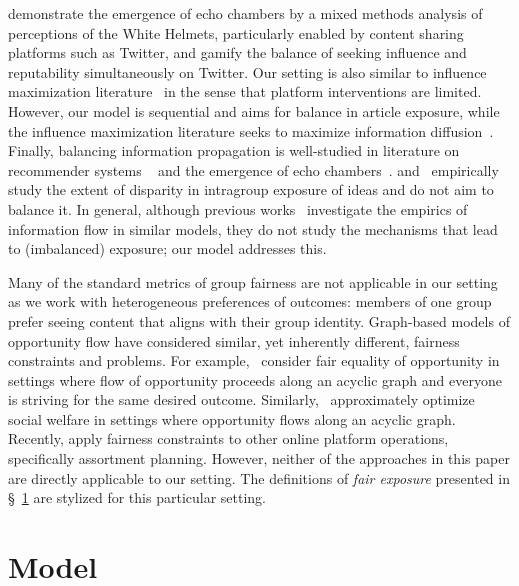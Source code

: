 \documentclass[letterpaper]{article} %
\begin{document}
\citet{starbird2018ecosystem} demonstrate the emergence of echo chambers by a mixed methods analysis of perceptions of the White Helmets, particularly enabled by content sharing platforms such as Twitter, and \citet{jeon2021chamberbreaker} gamify the balance of seeking influence and reputability simultaneously on Twitter.
%
Our setting is also similar to influence maximization literature~\citep{kempe2003maximizing} in the sense that platform interventions are limited.
%
However, our model is sequential and aims for balance in article exposure, while the influence maximization literature  seeks to maximize information diffusion~\citep{fish2019gaps,stoica2020seeding, ali2019fairness}.
%
Finally, balancing information propagation is well-studied in literature on recommender systems ~\citep{content_recommendation,adaptive_recommendation,NIPS2016_b0904096} and the emergence of echo chambers~\citep{barbera2015tweeting,mukerjee2020ideological,dubois2018echo,hosseinmardi2020evaluating}.
%
\citet{ReplicationExposure} and~\citet{balancedExposure} empirically study the extent of disparity in intragroup exposure of ideas and do not aim to balance it.
%
In general, although previous works~\citep{ReplicationExposure,balancedExposure} investigate the empirics of information flow in similar models, they do not study the mechanisms that lead to (imbalanced) exposure; our model addresses this.

Many of the standard metrics of group fairness are not applicable in our setting as we work with heterogeneous preferences of outcomes: members of one group prefer seeing content that aligns with their group identity.
%
Graph-based models of opportunity flow have considered similar, yet inherently different, fairness constraints and problems.
%
For example,~\citet{liu2021rawlsnet} consider fair equality of opportunity in settings where flow of opportunity proceeds along an acyclic graph and everyone is striving for the same desired outcome.
%
Similarly,~\citet{arunachaleswaran2021pipeline} approximately optimize social welfare in settings where opportunity flows along an acyclic graph.
%
Recently, \citet{chen2022fair} apply fairness constraints to other online platform operations, specifically assortment planning.
%
However, neither of the approaches in this paper are directly applicable to our setting.
%
The definitions of \emph{fair exposure} presented in \S~\ref{sec:model} are stylized for this particular setting.

\section{Model}\label{sec:model}
\end{document}
